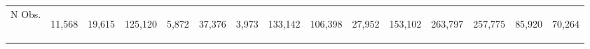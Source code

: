 \begin{center}
\begin{tabular}{lcccccccccccccc}
\noalign{\smallskip}\hline N Obs. & \begin{normalsize}11,568\end{normalsize} & \begin{normalsize}19,615\end{normalsize} & \begin{normalsize}125,120\end{normalsize} & \begin{normalsize}5,872\end{normalsize} & \begin{normalsize}37,376\end{normalsize} & \begin{normalsize}3,973\end{normalsize} & \begin{normalsize}133,142\end{normalsize} & \begin{normalsize}106,398\end{normalsize} & \begin{normalsize}27,952\end{normalsize} & \begin{normalsize}153,102\end{normalsize} & \begin{normalsize}263,797\end{normalsize} & \begin{normalsize}257,775\end{normalsize} & \begin{normalsize}85,920\end{normalsize} & \begin{normalsize}70,264\end{normalsize}\\

\end{tabular}
\end{center}
